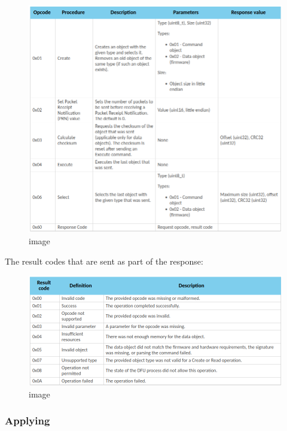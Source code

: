 \begin{figure}
\centering
\includegraphics{images/readme/screenshot_20-05-2023_11h26m13.png}
\caption{image}
\end{figure}

The result codes that are sent as part of the response:

\begin{figure}
\centering
\includegraphics{images/readme/screenshot_20-05-2023_11h36m40.png}
\caption{image}
\end{figure}

\hypertarget{applying}{%
\subsubsection{Applying}\label{applying}}

